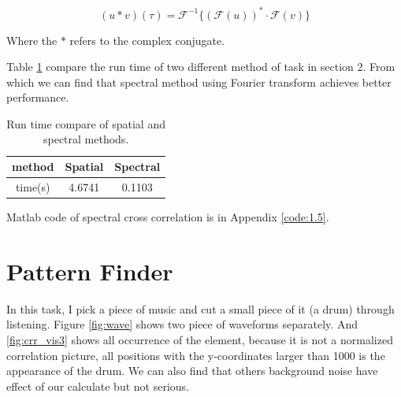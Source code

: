 \begin{equation*}
	(u*v)(\tau)=\mathcal{F}^{-1}\{(\mathcal{F}(u))^{*}\cdot \mathcal{F}(v)\}
\end{equation*}

Where the $*$ refers to the complex conjugate.

Table \ref{tab:run_time} compare the run time of two different method of task in section 2. From which we can find that spectral method using Fourier transform achieves better performance.

\begin{table}[h!]
	\centering
	\caption{Run time compare of spatial and spectral methods.}
	\begin{tabular}{c|c|c}
		\hline
		method & Spatial  & Spectral \\
		\hline
		time(s) & 4.6741 & 0.1103 \\
		\hline
	\end{tabular}
	\label{tab:run_time}
\end{table}

Matlab code of spectral cross correlation is in Appendix \ref{code:1.5}.

\section{Pattern Finder}

In this task, I pick a piece of music and cut a small piece of it (a drum) through listening. Figure \ref{fig:wave} shows two piece of  waveforms separately. And 
\ref{fig:crr_vis3} shows all occurrence of the element, because it is not a normalized correlation picture, all positions with the y-coordinates larger than 1000 is the appearance of the drum. We can also find that others background noise have effect of our calculate but not serious.

